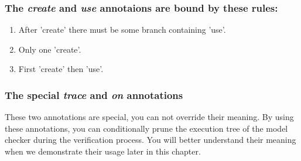 \subsubsection{The \emph{create} and \emph{use} annotaions are bound by these rules:}

\begin{enumerate}
  \item After 'create' there must be some branch containing 'use'.
  \item Only one 'create'.
  \item First 'create' then 'use'.
\end{enumerate}

\subsubsection{The special \emph{trace} and \emph{on} annotations}
These two annotations are special, you can not override their meaning. By using these annotations, you can conditionally prune the
execution tree of the model checker during the verification process. You will better understand their meaning when we demonstrate
their usage later in this chapter.